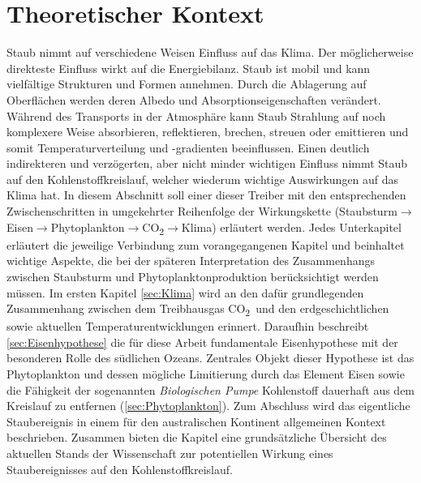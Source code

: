 \documentclass[12pt,a4paper,onecolumn,draft]{scrartcl}
\newcommand{\cotwo}{CO\textsubscript{2}}
\begin{document}
\section{Theoretischer Kontext} \label{sec:Theorie}
Staub nimmt auf verschiedene Weisen Einfluss auf das Klima. Der möglicherweise direkteste Einfluss wirkt auf die Energiebilanz. Staub ist mobil und kann vielfältige Strukturen und Formen annehmen. Durch die Ablagerung auf Oberflächen werden deren Albedo und Absorptionseigenschaften verändert. Während des Transports in der Atmosphäre kann Staub Strahlung auf noch komplexere Weise absorbieren, reflektieren, brechen, streuen oder emittieren \citep{Shao.2011} und somit Temperaturverteilung und -gradienten beeinflussen. Einen deutlich indirekteren und verzögerten, aber nicht minder wichtigen Einfluss nimmt Staub auf den Kohlenstoffkreislauf, welcher wiederum wichtige Auswirkungen auf das Klima hat. In diesem Abschnitt soll einer dieser Treiber mit den entsprechenden Zwischenschritten in umgekehrter Reihenfolge der Wirkungskette (Staubsturm$\rightarrow$Eisen$\rightarrow$Phytoplankton$\rightarrow$\cotwo $\rightarrow$Klima) erläutert werden. Jedes Unterkapitel erläutert die jeweilige Verbindung zum vorangegangenen Kapitel und beinhaltet wichtige Aspekte, die bei der späteren Interpretation des Zusammenhangs zwischen Staubsturm und Phytoplanktonproduktion berücksichtigt werden müssen. Im ersten Kapitel \ref{sec:Klima} wird an den dafür grundlegenden Zusammenhang zwischen dem Treibhausgas \cotwo \ und den erdgeschichtlichen sowie aktuellen Temperaturentwicklungen erinnert. Daraufhin beschreibt \ref{sec:Eisenhypothese} die für diese Arbeit fundamentale Eisenhypothese mit der besonderen Rolle des südlichen Ozeans. Zentrales Objekt dieser Hypothese ist das Phytoplankton und dessen mögliche Limitierung durch das Element Eisen sowie die Fähigkeit der sogenannten \textit{Biologischen Pumpe} Kohlenstoff dauerhaft aus dem Kreislauf zu entfernen (\ref{sec:Phytoplankton}). Zum Abschluss wird das eigentliche Staubereignis in einem für den australischen Kontinent allgemeinen Kontext beschrieben. Zusammen bieten die Kapitel eine grundsätzliche Übersicht des aktuellen Stands der Wissenschaft zur potentiellen Wirkung eines Staubereignisses auf den Kohlenstoffkreislauf.
\end{document}
